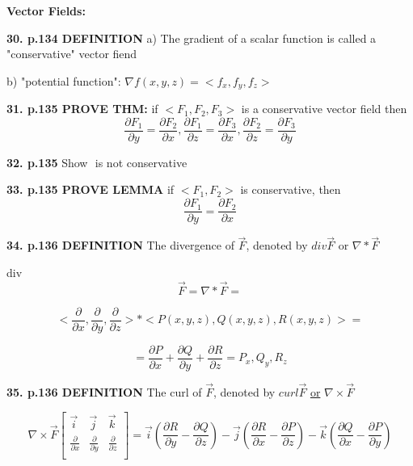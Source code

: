 \documentclass{article}
\begin{document}
\vspace{15mm}
{\Large \textbf{Vector Fields:}}

\vspace{5mm}
\textbf{30. p.134 DEFINITION} a) The gradient of a scalar function is called a "conservative" vector fiend

\vspace{5mm}
b) "potential function": $\nabla f(x,y,z) = <f_x,f_y,f_z>$

\vspace{10mm}
\textbf{31. p.135 PROVE THM:} if \(<F_1, F_2, F_3>\) is a conservative vector field then $$\frac{\partial F_1}{\partial y} = \frac{\partial F_2}{\partial x}, \frac{\partial F_1}{\partial z} = \frac{\partial F_3}{\partial x}, \frac{\partial F_2}{\partial z} = \frac{\partial F_3}{\partial y}$$

\vspace{5mm}
\textbf{32. p.135} Show \(<y, 0, 0>\) is not conservative

\vspace{5mm}
\textbf{33. p.135 PROVE LEMMA} if \(<F_1, F_2>\) is conservative, then
 $$\frac{\partial F_1}{\partial y} = \frac{\partial F_2}{\partial x}$$

\vspace{5mm}
\textbf{34. p.136 DEFINITION} The divergence of \(\Vec{F}\), denoted by \(div \Vec{F}\) or \(\nabla * \Vec{F}\)

div $$\Vec{F} = \nabla * \Vec{F} = $$

$$<\frac{\partial }{\partial x}, \frac{\partial }{\partial y}, \frac{\partial }{\partial z}> * <P(x,y,z), Q(x,y,z), R(x,y,z)> = $$

$$ = \frac{\partial P}{\partial x} + \frac{\partial Q}{\partial y} + \frac{\partial R}{\partial z} = P_x, Q_y, R_z$$

\vspace{5mm}
\textbf{35. p.136 DEFINITION} The curl of \(\Vec{F}\), denoted by \(curl \Vec{F}\) \underline{or} \(\nabla \times \Vec{F}\)

$$\nabla \times \Vec{F} \begin{bmatrix}
    \Vec{i} &\Vec{j} &\Vec{k} \\
    \frac{\partial }{\partial x}    &\frac{\partial }{\partial y}   &\frac{\partial }{\partial z}  \\
\end{bmatrix} = \Vec{i} (\frac{\partial R}{\partial y} - \frac{\partial Q}{\partial z}) - \Vec{j}(\frac{\partial R}{\partial x} - \frac{\partial P}{\partial z})- \Vec{k}(\frac{\partial Q}{\partial x} - \frac{\partial P}{\partial y})$$
\end{document}
